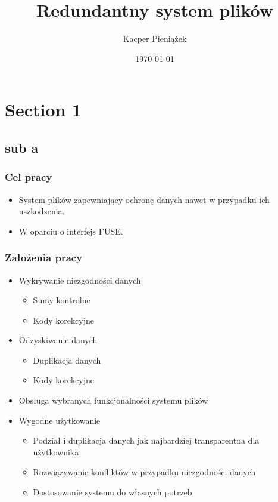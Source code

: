 \documentclass{beamer}
\title{Redundantny system plików}
\author{Kacper Pieniążek}
\date{\today}
\begin{document}
	\begin{frame}
		\titlepage
	\end{frame}

	\section{Section 1}
	\subsection{sub a}
	
	\begin{frame}
		\frametitle{Cel pracy}
		\begin{itemize}
			\item System plików zapewniający ochronę danych nawet w przypadku ich uszkodzenia.
			\item W oparciu o interfejs FUSE.
		\end{itemize}
		
	\end{frame}

	\begin{frame}
		\frametitle{Założenia pracy}
		\begin{itemize}
			\pause
			\item Wykrywanie niezgodności danych
				\begin{itemize}
					\item Sumy kontrolne
					\item Kody korekcyjne
				\end{itemize}
			\pause
			\item Odzyskiwanie danych
			\begin{itemize}
				\item Duplikacja danych
				\item Kody korekcyjne
			\end{itemize}
			\pause
			\item Obsługa wybranych funkcjonalności systemu plików
			\pause
			\item Wygodne użytkowanie
			\begin{itemize}
				\item Podział i duplikacja danych jak najbardziej transparentna dla użytkownika
				\item Rozwiązywanie konfliktów w przypadku niezgodności danych
				\item Dostosowanie systemu do własnych potrzeb
			\end{itemize}
		\end{itemize}
	\end{frame}
	
\end{document}
